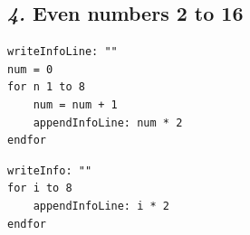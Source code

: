 \documentclass[12pt, english]{article}
\begin{document}
\subsection*{\emph{4.} Even numbers 2 to 16}

\begin{lstlisting}
writeInfoLine: ""
num = 0
for n 1 to 8
    num = num + 1
    appendInfoLine: num * 2
endfor
\end{lstlisting}

\begin{lstlisting}[rulesepcolor=\color{blue}]
writeInfo: ""
for i to 8
    appendInfoLine: i * 2
endfor
\end{lstlisting}

\vspace{10pt}

\end{document}
